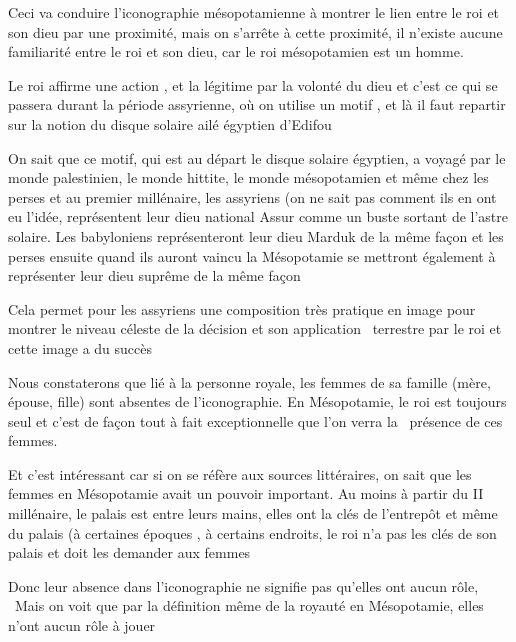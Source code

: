 \documentclass[a4paper]{article}
\begin{document}
\bigskip

{
Ceci va conduire l'iconographie mésopotamienne à montrer le lien entre
le roi et son dieu par une proximité, mais on s'arrête à cette
proximité, il n'existe aucune familiarité entre le roi et son dieu, car
le roi mésopotamien est un homme.}

{
Le roi affirme une action , et la légitime par la volonté du dieu et
c'est ce qui se passera durant la période assyrienne, où on utilise un
motif , et là il faut repartir sur la notion du disque solaire ailé
égyptien d'Edifou}


\bigskip

{
On sait que ce motif, qui est au départ le disque solaire égyptien, a
voyagé par le monde palestinien, le monde hittite, le monde
mésopotamien et même chez les perses et au premier millénaire, les
assyriens (on ne sait pas comment ils en ont eu l'idée, représentent
leur dieu national Assur comme un buste sortant de l'astre solaire. Les
babyloniens représenteront leur dieu Marduk de la même façon et les
perses ensuite quand ils auront vaincu la Mésopotamie se mettront
également à représenter leur dieu suprême de la même façon}

{
\newline
Cela permet pour les assyriens une composition très pratique en image
pour montrer le niveau céleste de la décision et son application
\ terrestre par le roi et cette image a du succès}


\bigskip

{
Nous constaterons que lié à la personne royale, les femmes de sa famille
(mère, épouse, fille) sont absentes de l'iconographie. En Mésopotamie,
le roi est toujours seul et c'est de façon tout à fait exceptionnelle
que l'on verra la \ présence de ces femmes.}


\bigskip

{
Et c'est intéressant car si on se réfère aux sources littéraires, on
sait que les femmes en Mésopotamie avait un pouvoir important. Au moins
à partir du II millénaire, le palais est entre leurs mains, elles ont
la clés de l'entrepôt et même du palais (à certaines époques , à
certains endroits, le roi n'a pas les clés de son palais et doit les
demander aux femmes}


\bigskip

{
Donc leur absence dans l'iconographie ne signifie pas qu'elles ont aucun
rôle, \ Mais on voit que par la définition même de la royauté en
Mésopotamie, elles n'ont aucun rôle à jouer}
\end{document}
